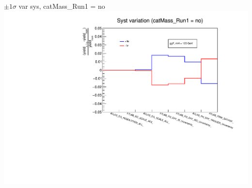 \documentclass[10pt,UKenglish, leqno, xcolor = dvipsnames]{beamer}
\begin{document}
	
		\begin{frame}{$\pm1\sigma$ var sys, catMass\_Run1 = no}
			\vfill
			\centering
			\includegraphics[width=.9\textwidth]{../images/week_12/Syst/var_cat_no.pdf}
			\vfill
		\end{frame}
		
\end{document}
